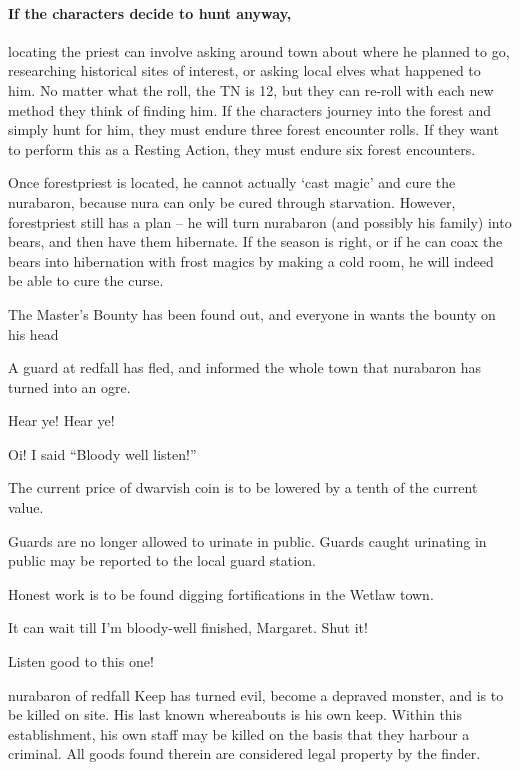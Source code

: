 \begin{multicols}{2}
\paragraph{If the characters decide to hunt anyway,}
locating the priest can involve asking around \gls{town} about where he planned to go, researching historical sites of interest, or asking local elves what happened to him.
No matter what the roll, the TN is 12, but they can re-roll with each new method they think of finding him.
If the characters journey into the forest and simply hunt for him, they must endure three forest encounter rolls.
If they want to perform this as a Resting Action, they must endure six forest encounters.

Once \gls{forestpriest} is located, he cannot actually `cast magic' and cure the \gls{nurabaron}, because nura can only be cured through starvation.
However, \gls{forestpriest} still has a plan -- he will turn \gls{nurabaron} (and possibly his family) into bears, and then have them hibernate.
If the season is right, or if he can coax the bears into hibernation with frost magics by making a cold room, he will indeed be able to cure the curse.


{\N \N The Master's Bounty}%
{ has been found out, and everyone in  wants the bounty on his head}%

A guard at \gls{redfall} has fled, and informed the whole town that \gls{nurabaron} has turned into an ogre.

\begin{speechtext}

		Hear ye! Hear ye!

		Oi! I said ``Bloody well listen!''

		The current price of dwarvish coin is to be lowered by a tenth of the current value.

		Guards are no longer allowed to urinate in public.
		Guards caught urinating in public may be reported to the local guard station.

		Honest work is to be found digging fortifications in the Wetlaw town.

		It can wait till I'm bloody-well finished, Margaret.  Shut it!

		Listen good to this one!

		\gls{nurabaron} of \gls{redfall} Keep has turned evil, become a depraved monster, and is to be killed on site.  His last known whereabouts is his own keep.  Within this establishment, his own staff may be killed on the basis that they harbour a criminal.  All goods found therein are considered legal property by the finder.


\end{speechtext}
\end{multicols}

